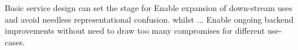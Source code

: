 Basic service design can set the stage for
Enable expansion of down-stream uses and avoid needless representational confusion.
whilst ...
Enable ongoing backend improvements without need to draw too many compromises for different use-cases.

%


%
%
